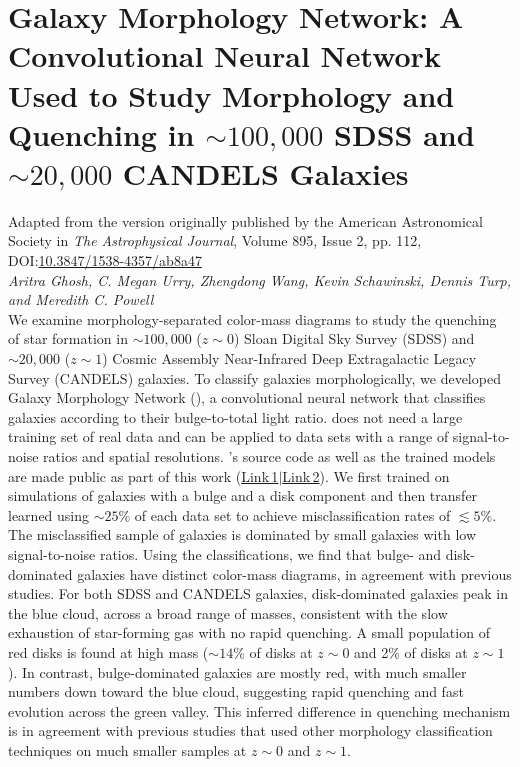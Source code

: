 \chapter{Galaxy Morphology Network: A Convolutional Neural Network Used to Study Morphology and Quenching in $\sim 100,000$ SDSS and $\sim 20,000$ CANDELS Galaxies \label{ch:gamornet}}

Adapted from the version originally published by the American Astronomical Society in \textit{The Astrophysical Journal}, Volume 895, Issue 2, pp. 112, DOI:\href{https://iopscience.iop.org/article/10.3847/1538-4357/ab8a47/meta}{10.3847/1538-4357/ab8a47}\\
{\large \emph{Aritra Ghosh, C. Megan Urry, Zhengdong Wang, Kevin Schawinski, Dennis Turp, and Meredith C. Powell} }\\


We examine morphology-separated color-mass diagrams to study the quenching of star formation in $\sim 100,000$ ($z\sim0$) Sloan Digital Sky Survey (SDSS) and $\sim 20,000$ ($z\sim1$) Cosmic Assembly Near-Infrared Deep Extragalactic Legacy Survey (CANDELS) galaxies. To classify galaxies morphologically, we developed Galaxy Morphology Network (\gamornet{}), a convolutional neural network that classifies galaxies according to their bulge-to-total light ratio. \gamornet{} does not need a large training set of real data and can be applied to data sets with a range of signal-to-noise ratios and spatial resolutions. \gamornet{}'s source code as well as the trained models are made public as part of this work (\href{http://www.astro.yale.edu/aghosh/gamornet.html}{Link\,1}$\vert$\href{http://gamornet.ghosharitra.com}{Link\,2}). We first trained \gamornet{} on simulations of galaxies with a bulge and a disk component and then transfer learned using $\sim25\%$ of each data set to achieve misclassification rates of $\lesssim5\%$. The misclassified sample of galaxies is dominated by small galaxies with low signal-to-noise ratios. Using the \gamornet{} classifications, we find that bulge- and disk-dominated galaxies have distinct color-mass diagrams, in agreement with previous studies. For both SDSS and CANDELS galaxies, disk-dominated galaxies peak in the blue cloud, across a broad range of masses, consistent with the slow exhaustion of star-forming gas with no rapid quenching. A small population of red disks is found at high mass ($\sim14$\% of disks at $z\sim0$ and 2\% of disks at $z \sim 1$). In contrast, bulge-dominated galaxies are mostly red, with much smaller numbers down toward the blue cloud, suggesting rapid quenching and fast evolution across the green valley. This inferred difference in quenching mechanism is in agreement with previous studies that used other morphology classification techniques on much smaller samples at $z\sim0$ and $z\sim1$.

